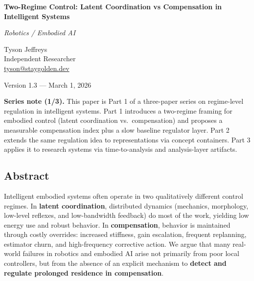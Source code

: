 \documentclass[11pt]{article}
\begin{document}
\begin{titlepage}
\thispagestyle{empty}
\raggedright

\vspace*{0.62\textheight}

{\Large\bfseries Two-Regime Control: Latent Coordination vs Compensation in Intelligent Systems\par}
\vspace{0.4em}
{\large\itshape Robotics / Embodied AI\par}

\vspace{1.6em}

Tyson Jeffreys\\
Independent Researcher\\
\href{mailto:tyson@staygolden.dev}{tyson@staygolden.dev}

\vspace{1.6em}

Version 1.3 --- March 1, 2026

\end{titlepage}

\noindent\textbf{Series note (1/3).} This paper is Part 1 of a three-paper series on regime-level regulation in intelligent systems. Part 1 introduces a two-regime framing for embodied control (latent coordination vs.\ compensation) and proposes a measurable compensation index plus a slow baseline regulator layer. Part 2 extends the same regulation idea to representations via concept containers. Part 3 applies it to research systems via time-to-analysis and analysis-layer artifacts.\par\medskip
\hypertarget{abstract}{%
\subsection{Abstract}\label{abstract}}

Intelligent embodied systems often operate in two qualitatively different control regimes. In \textbf{latent coordination}, distributed dynamics (mechanics, morphology, low-level reflexes, and low-bandwidth feedback) do most of the work, yielding low energy use and robust behavior. In \textbf{compensation}, behavior is maintained through costly overrides: increased stiffness, gain escalation, frequent replanning, estimator churn, and high-frequency corrective action. We argue that many real-world failures in robotics and embodied AI arise not primarily from poor local controllers, but from the absence of an explicit mechanism to \textbf{detect and regulate prolonged residence in compensation}.
\end{document}
